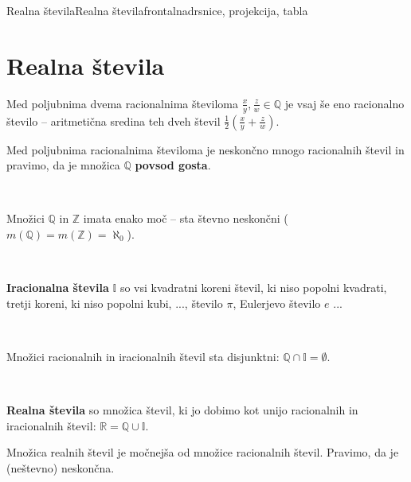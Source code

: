 \begin{priprava}{1}{}{Realna števila}{Realna števila}{frontalna}{drsnice, projekcija, tabla}
    
    \section{Realna števila}

        

                Med poljubnima dvema racionalnima številoma $\frac{x}{y}, \frac{z}{w}\in\mathbb{Q}$ je vsaj še eno racionalno število
                 -- aritmetična sredina teh dveh števil $\frac{1}{2}\left(\frac{x}{y}+\frac{z}{w}\right)$.

            
            
                
            
                Med poljubnima racionalnima številoma je neskončno mnogo racionalnih števil in pravimo, da je množica $\mathbb{Q}$ \textbf{povsod gosta}. 
            
                ~
            
                Množici $\mathbb{Q}$ in $\mathbb{Z}$ imata enako moč -- sta števno neskončni ($m(\mathbb{Q})=m(\mathbb{Z})=\aleph_0$).
            
        

                ~
        
                \textbf{Iracionalna števila} $\mathbb{I}$ so vsi kvadratni koreni števil, ki niso popolni kvadrati, tretji koreni, ki niso popolni kubi, ..., 
                število $\pi$, Eulerjevo število $e$ ... 
            
                ~
            
                Množici racionalnih in iracionalnih števil sta disjunktni: $\mathbb{Q}\cap\mathbb{I}=\emptyset$.
            
                
                ~

                \textbf{Realna števila} so množica števil, ki jo dobimo kot unijo racionalnih in iracionalnih števil: $\mathbb{R}=\mathbb{Q}\cup\mathbb{I}$.
            

            
                Množica realnih števil je močnejša od množice racionalnih števil. Pravimo, da je (neštevno) neskončna.
            


\end{priprava}
